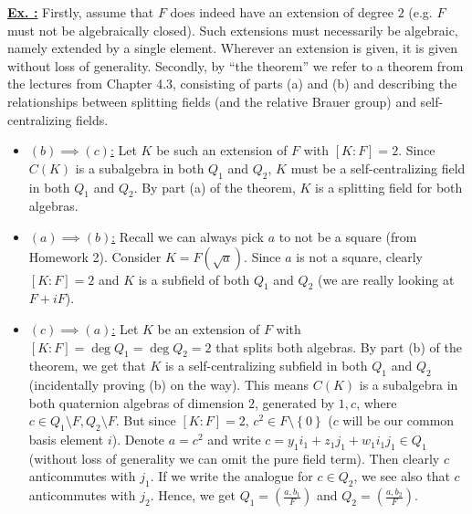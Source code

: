 \documentclass[a4paper, 12pt]{article}
\newcounter{excounter}[section]
\newenvironment{Exercise}
    {\refstepcounter{excounter}\underline{\textbf{Ex. \theexcounter:}}}
    {\par\vspace{\baselineskip}}
\begin{document}
\begin{Exercise}
    Firstly, assume that $F$ does indeed have an extension of degree $2$ (e.g. $F$ must not be algebraically closed).
    Such extensions must necessarily be algebraic, namely extended by a single element. Wherever an extension is given, it is given without loss of generality.
    Secondly, by ``the theorem'' we refer to a theorem from the lectures from Chapter 4.3, consisting of parts (a) and (b) and describing the relationships between splitting fields (and the relative Brauer group) and self-centralizing fields.
    \begin{itemize}
        \item \underline{$(b)\implies (c)$:}
            Let $K$ be such an extension of $F$ with $[K : F] = 2$.
            Since $C(K)$ is a subalgebra in both $Q_1$ and $Q_2$, $K$ must be a self-centralizing field in both $Q_1$ and $Q_2$.
            By part (a) of the theorem, $K$ is a splitting field for both algebras.
        \item \underline{$(a) \implies (b)$:}
            Recall we can always pick $a$ to not be a square (from Homework 2).
            Consider $K = F(\sqrt{a})$.
            Since $a$ is not a square, clearly $[K : F ] = 2$ and $K$ is a subfield of both $Q_1$ and $Q_2$ (we are really looking at $F + iF$).
        \item \underline{$(c) \implies (a)$:}
            Let $K$ be an extension of $F$ with $[K : F] = \deg Q_1 = \deg Q_2 = 2$ that splits both algebras.
            By part (b) of the theorem, we get that $K$ is a self-centralizing subfield in both $Q_1$ and $Q_2$ (incidentally proving (b) on the way).
            This means $C(K)$ is a subalgebra in both quaternion algebras of dimension $2$, generated by ${1, c}$, where $c \in Q_1\setminus F, Q_2\setminus F$.
            But since $[K : F] = 2$, $c^2 \in F\setminus \left\{ 0 \right\}$ ($c$ will be our common basis element $i$).
            Denote $a = c^2$ and write $c = y_1 i_1 + z_1 j_1 + w_1 i_1 j_1 \in Q_1$ (without loss of generality we can omit the pure field term).
            Then clearly $c$ anticommutes with $j_1$. If we write the analogue for $c \in Q_2$, we see also that $c$ anticommutes with $j_2$.
            Hence, we get $Q_1 = \left( \frac{a, b_1}{F} \right)$ and $Q_2 = \left( \frac{a, b_2}{F} \right)$.
    \end{itemize}
\end{Exercise}
\end{document}
